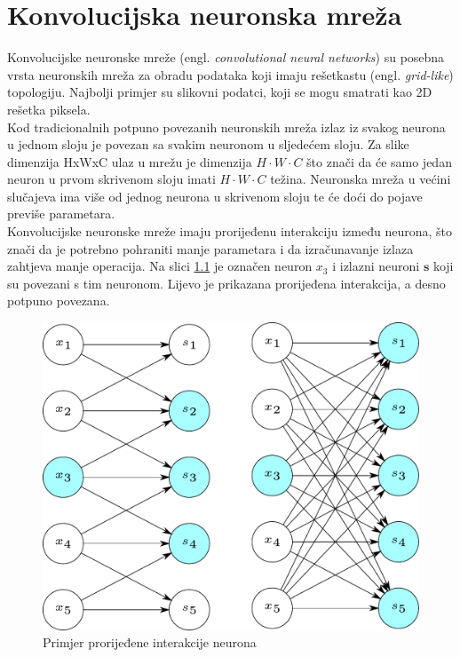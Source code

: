 \documentclass[times, utf8, zavrsni, numeric]{fer}
\renewcommand{\vec}[1]{\mathbf{#1}}
\begin{document}
\chapter{Konvolucijska neuronska mreža}
Konvolucijske neuronske mreže (engl. \textit{convolutional neural networks}) 
su posebna vrsta neuronskih mreža za obradu podataka koji imaju rešetkastu
(engl. \textit{grid-like}) topologiju. Najbolji primjer su slikovni podatci,
koji se mogu smatrati kao 2D rešetka piksela. 
\\\indent Kod tradicionalnih potpuno povezanih neuronskih mreža izlaz iz
svakog neurona u jednom sloju je povezan sa svakim neuronom u sljedećem sloju.
Za slike dimenzija HxWxC ulaz u mrežu je dimenzija $H \cdot W \cdot C$ što
znači da će samo jedan neuron u prvom skrivenom sloju
imati $H \cdot W \cdot C$ težina. Neuronska mreža u većini slučajeva ima
više od jednog neurona u skrivenom sloju te će doći do pojave previše
parametara.
\\\indent Konvolucijske neuronske mreže imaju prorijeđenu interakciju između
neurona, što znači da je potrebno pohraniti manje parametara i da izračunavanje 
izlaza zahtjeva manje operacija. Na slici \ref{fig:pror} je označen neuron
$x_3$ i izlazni neuroni $\vec{s}$ koji su povezani s tim neuronom. Lijevo
je prikazana prorijeđena interakcija, a desno potpuno povezana.
\begin{figure}[htb]
	\centering
	\includegraphics[scale=0.45]{pror.pdf}
	\caption{Primjer prorijeđene interakcije neurona}
	\label{fig:pror}
\end{figure}
\end{document}
